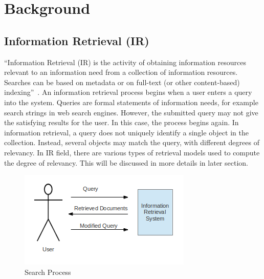 
\section{Background}

\subsection{Information Retrieval (IR)}
``Information Retrieval (IR) is the activity of obtaining information resources relevant to an information need from a collection of information resources. 
Searches can be based on metadata or on full-text (or other content-based) indexing''~\cite{IR}. An information retrieval process begins when a user 
enters a query into the system. Queries are formal statements of information needs, for example search strings in web search engines. However, the 
submitted query may not give the satisfying results for the user. In this case, the process begins again.
In information retrieval, a query does not uniquely identify a single object in the collection. Instead, several objects may match the query, 
with different degrees of relevancy. In IR field, there are various types of retrieval models used to compute the degree of relevancy. This will
be discussed in more details in later section.

\begin{figure}
\centering
\includegraphics[scale=1]{./figures/retrieval_process.png}
\caption{Search Process} \label{fig:retrieval_process} 
\end{figure}

